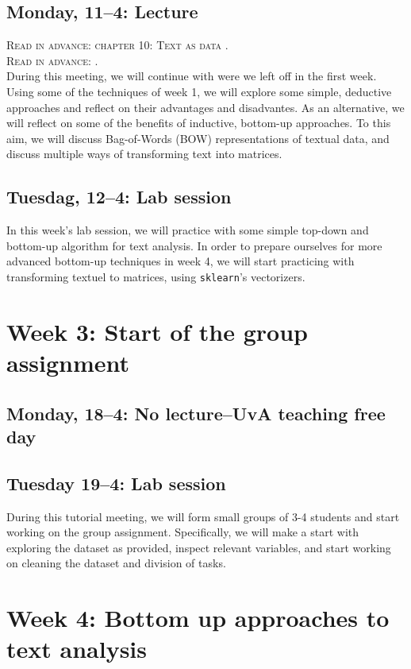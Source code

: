 \subsection*{Monday, 11--4: Lecture}
\textsc{Read in advance: chapter 10: Text as data \cite{van2021computational}.} \\
\textsc{Read in advance: \cite{Boumans2016}.} \\

During this meeting, we will continue with were we left off in the first week. Using some of the techniques of week 1, we will explore some simple, deductive approaches and reflect on their advantages and disadvantes. As an alternative, we will reflect on some of the benefits of inductive, bottom-up approaches. To this aim, we will discuss Bag-of-Words (BOW) representations of textual data, and discuss multiple ways of transforming text into matrices. 

\subsection*{Tuesdag, 12--4: Lab session}
In this week's lab session, we will practice with some simple top-down and bottom-up algorithm for text analysis. In order to prepare ourselves for more advanced bottom-up techniques in week 4, we will start practicing with transforming textuel to matrices, using  \texttt{sklearn}'s vectorizers. 

\section*{Week 3: Start of the group assignment}

\subsection*{Monday, 18--4: No lecture--UvA teaching free day}

\subsection*{Tuesday 19--4: Lab session}
During this tutorial meeting, we will form small groups of 3-4 students and start working on the group assignment. Specifically, we will make a start with exploring the dataset as provided, inspect relevant variables, and start working on cleaning the dataset and division of tasks. 

\section*{Week 4: Bottom up approaches to text analysis}

